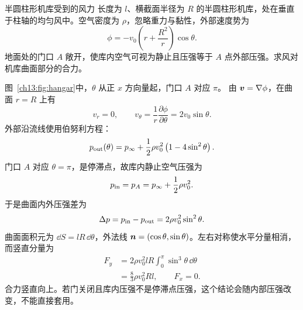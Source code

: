 \begin{origexamplebox}{半圆柱形机库受到的风力}\label{ch13:ex:hangar}
长度为 $l$、横截面半径为 $R$ 的半圆柱形机库，处在垂直于柱轴的均匀风中。空气密度为 $\rho$，忽略重力与黏性，外部速度势为
\[
 \phi=-v_0\left(r+\frac{R^2}{r}\right)\cos\theta .
\]
地面处的门口 $A$ 敞开，使库内空气可视为静止且压强等于 $A$ 点外部压强。求风对机库曲面部分的合力。

\FluidHangarDiagram
\end{origexamplebox}
\begin{xesolution}
\ThAHangar

图~\ref{ch13:fig:hangar}中，$\theta$ 从正 $x$ 方向量起，门口 $A$ 对应 $\pi$。
由 $\bm{v}=\nabla\phi$，在曲面 $r=R$ 上有
\[
 v_r=0,\qquad v_\theta=\frac1r\frac{\partial\phi}{\partial\theta}
 =2v_0\sin\theta.
\]
外部沿流线使用伯努利方程：
\[
 p_{\rm out}(\theta)=p_\infty+\frac12\rho v_0^2
 \left(1-4\sin^2\theta\right).
\]
门口 $A$ 对应 $\theta=\pi$，是停滞点，故库内静止空气压强为
\[
 p_{\rm in}=p_A=p_\infty+\frac12\rho v_0^2.
\]
于是曲面内外压强差为
\[
 \Delta p=p_{\rm in}-p_{\rm out}=2\rho v_0^2\sin^2\theta.
\]
曲面面积元为 $\dd S=lR\,\dd\theta$，外法线
$\bm{n}=(\cos\theta,\sin\theta)$。左右对称使水平分量相消，而竖直分量为
\begin{align*}
 F_y&=2\rho v_0^2lR\int_0^\pi\sin^3\theta\,\dd\theta\\
 &=\boxed{\frac83\rho v_0^2Rl},\qquad F_x=0.
\end{align*}
合力竖直向上。若门关闭且库内压强不是停滞点压强，这个结论会随内部压强改变，不能直接套用。
\end{xesolution}

